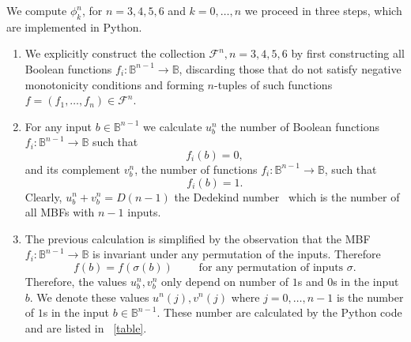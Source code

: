 \documentclass[11pt,a4paper]{article}
\newcommand{\bbB}{\mathbb{B}}
\theoremstyle{definition}
\theoremstyle{remark}
\begin{document}
We compute  $\phi^n_k$, for $n=3,4,5,6$ and $k=0, \ldots,n$ we proceed in three steps, which are implemented in  Python.
\begin{enumerate}
\item We explicitly construct the collection $\mathcal{ F}^n, n=3,4,5,6$ by first constructing all Boolean functions $f_i: \bbB^{n-1} \to \bbB$, discarding those that do not satisfy negative monotonicity conditions and forming $n$-tuples of such functions $f=(f_1, \ldots, f_n) \in \mathcal{ F}^n$.
\item For any input $b \in \bbB^{n-1}$ we calculate $u^n_b$ the number of Boolean functions $f_i:\bbB^{n-1} \to \bbB$ such that 
\[ f_i(b) = 0,\]
and its complement $v^n_b$, the number of functions $f_i:\bbB^{n-1} \to \bbB$, such that 
\[ f_i(b) = 1.\]
Clearly, $u^n_b+v^n_b = D(n-1)$ the Dedekind number~\parencite{fidytek_algorithms_2001,jakel_computation_2023} which is the number of all MBFs with $n-1$ inputs.
\item The previous calculation is simplified by the observation that the MBF $f_i: \bbB^{n-1} \to \bbB$ is invariant under any permutation of the inputs. Therefore 
\[ f(b) = f(\sigma(b)) \qquad \mbox{ for any permutation of inputs } \sigma. \]
Therefore, the values $u^n_b,v^n_b $ only depend on number of $1$s and $0$s in the input $b$. We denote these values 
$u^n(j),v^n(j)$ where $j= 0, \ldots, n-1$ is the number of $1$s in the input $b \in \bbB^{n-1}$.
These number are calculated by the Python code and are listed in ~\cref{table}.


\end{enumerate}
\end{document}
